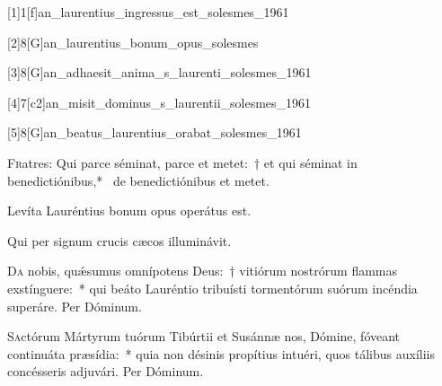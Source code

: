 \documentclass[vesperale_romanum.tex]{subfiles}
\begin{document}


[1]{1}[f]{an_laurentius_ingressus_est_solesmes_1961}

[2]{8}[G]{an_laurentius_bonum_opus_solesmes}

[3]{8}[G]{an_adhaesit_anima_s_laurenti_solesmes_1961}

[4]{7}[c2]{an_misit_dominus_s_laurentii_solesmes_1961}
\label{112_7c2_aug} 
{}

[5]{8}[G]{an_beatus_laurentius_orabat_solesmes_1961}


\lettrine{F}{r}atres: Qui parce séminat, parce et metet:~† et qui séminat in benedictiónibus,*~ de benedictiónibus et metet.


\vv Levíta Lauréntius bonum opus operátus est.

\rr Qui per signum crucis cæcos illuminávit.


\oratio

\lettrine{D}{a} nobis, quǽsumus omnípotens Deus:~† vitiórum nostrórum flammas exstínguere:~* qui beáto Lauréntio tribuísti tormentórum suórum incéndia superáre. Per Dóminum.

\nocommseq


\myrule
\newpage
{}

\simplex

\oratio

\lettrine{S}{a}ctórum Mártyrum tuórum Tibúrtii et Susánnæ nos, Dómine, fóveant continuáta præsídia:~* quia non désinis propítius intuéri, quos tálibus auxíliis concésseris adjuvári.
Per Dóminum.
\end{document}
